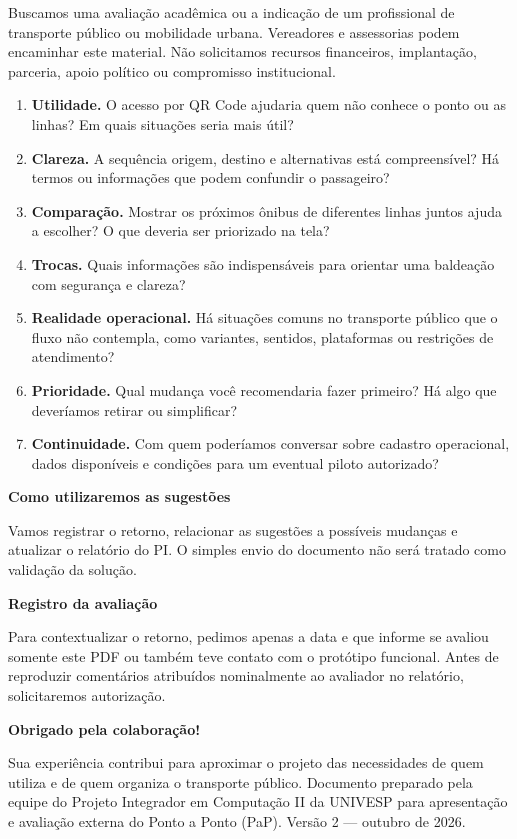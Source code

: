 \documentclass[11pt,a4paper]{article}
\newcommand{\bloco}[2]{\par\smallskip\noindent\colorbox{paplight}{\parbox{\dimexpr\linewidth-2\fboxsep\relax}{\vspace{2mm}\textbf{\color{papblue}#1}\par\smallskip #2\vspace{2mm}}}\par\smallskip}
\begin{document}
Buscamos uma avaliação acadêmica ou a indicação de um profissional de transporte público ou mobilidade urbana. Vereadores e assessorias podem encaminhar este material. Não solicitamos recursos financeiros, implantação, parceria, apoio político ou compromisso institucional.
\begin{enumerate}
\item \textbf{Utilidade.} O acesso por QR Code ajudaria quem não conhece o ponto ou as linhas? Em quais situações seria mais útil?
\item \textbf{Clareza.} A sequência origem, destino e alternativas está compreensível? Há termos ou informações que podem confundir o passageiro?
\item \textbf{Comparação.} Mostrar os próximos ônibus de diferentes linhas juntos ajuda a escolher? O que deveria ser priorizado na tela?
\item \textbf{Trocas.} Quais informações são indispensáveis para orientar uma baldeação com segurança e clareza?
\item \textbf{Realidade operacional.} Há situações comuns no transporte público que o fluxo não contempla, como variantes, sentidos, plataformas ou restrições de atendimento?
\item \textbf{Prioridade.} Qual mudança você recomendaria fazer primeiro? Há algo que deveríamos retirar ou simplificar?
\item \textbf{Continuidade.} Com quem poderíamos conversar sobre cadastro operacional, dados disponíveis e condições para um eventual piloto autorizado?
\end{enumerate}
\bloco{Como utilizaremos as sugestões}{Vamos registrar o retorno, relacionar as sugestões a possíveis mudanças e atualizar o relatório do PI. O simples envio do documento não será tratado como validação da solução.}
\textbf{Registro da avaliação}

Para contextualizar o retorno, pedimos apenas a data e que informe se avaliou somente este PDF ou também teve contato com o protótipo funcional. Antes de reproduzir comentários atribuídos nominalmente ao avaliador no relatório, solicitaremos autorização.
\vspace{5mm}
{\large\color{papblue}\textbf{Obrigado pela colaboração!}\par}
Sua experiência contribui para aproximar o projeto das necessidades de quem utiliza e de quem organiza o transporte público.
\vfill
{\small\color{papgray}Documento preparado pela equipe do Projeto Integrador em Computação II da UNIVESP para apresentação e avaliação externa do Ponto a Ponto (PaP). Versão 2 — outubro de 2026.}
\end{document}
